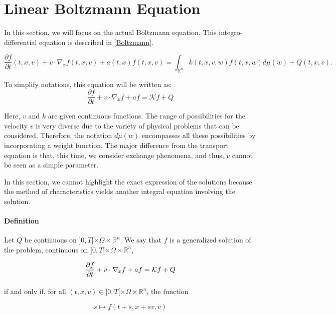 \documentclass[onecolumn, 12pt, a4paper]{article}
\begin{document}
	\section{Linear Boltzmann Equation}
	
	In this section, we will focus on the actual Boltzmann equation. This integro-differential equation is described in \ref{Boltzmann}.
	
	\begin{equation} \label{Boltzmann}
		\frac{\partial f}{\partial t}(t,x,v)+v \cdot \nabla_x f(t,x,v) + a(t,x)f(t,x,v) = \int_{\mathbb{R}^n}k(t,x,v,w)f(t,x,w)d\mu(w)+Q(t,x,v).
	\end{equation}
	
	To simplify notations, this equation will be written as: 
	\[ \frac{\partial f}{\partial t}+v \cdot \nabla_x f +af =   \mathcal{K} f +Q \]
	
	Here, $v$ and $k$ are given continuous functions. The range of possibilities for the velocity $v$ is very diverse due to the variety of physical problems that can be considered. Therefore, the notation $d\mu(w)$ encompasses all these possibilities by incorporating a weight function. The major difference from the transport equation is that, this time, we consider exchange phenomena, and thus, $v$ cannot be seen as a simple parameter.
	
	In this section, we cannot highlight the exact expression of the solutions because the method of characteristics yields another integral equation involving the solution.
	
	
	
	
	\paragraph{Definition}
	
	Let $Q$ be continuous on $]0,T[\times \Omega \times \mathbb{R}^n$. We say that $f$ is a generalized solution of the problem, continuous on $]0,T[\times \Omega \times \mathbb{R}^n$,
	
	
	$$\frac{\partial f}{\partial t}+v \cdot \nabla_x f +af = \mathcal{K} f +Q\\$$
	
	\paragraph{}
	if and only if, for all $(t,x,v) \in ]0,T[\times \Omega \times \mathbb{R}^n$, the function 
	
	\[ s \mapsto f(t+s,x+sv,v) \]
	
\end{document}
